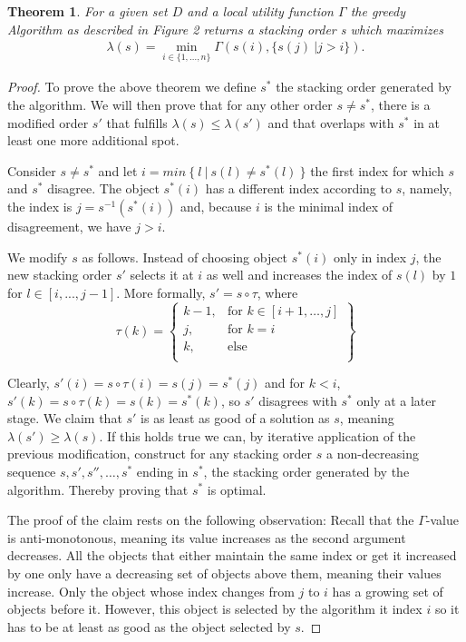 \documentclass[a4paper,11pt]{article}
\newtheorem{theorem}{Theorem}
\begin{document}
\begin{theorem}
  For a given set $D$ and a local utility function $\Gamma$ the greedy Algorithm as described in Figure 2 returns a stacking order s which maximizes\begin{align*}
    \lambda(s) = \min_{i \in \{1,\dots,n\}} \Gamma(s(i), \{s(j)\ | j > i\}).
  \end{align*}
\end{theorem}

\begin{proof}
To prove the above theorem we define $s^*$ the stacking order generated by the algorithm. We will then prove that for any other order $s\neq s^*$, there is a modified order $s'$ that fulfills $\lambda(s)\leq\lambda(s')$ and that overlaps with $s^*$ in at least one more additional spot.

Consider $s\neq s^*$ and let $i=min\ \{\ l\ |\ s(l)\neq s^*(l)\ \}$ the first index for which $s$ and $s^*$ disagree. The object $s^*(i)$ has a different index according to $s$, namely, the index is $j=s^{-1}(s^*(i))$ and, because $i$ is the minimal index of disagreement, we have $j>i$.

We modify $s$ as follows. Instead of choosing object $s^*(i)$ only in index $j$, the new stacking order $s'$ selects it at $i$ as well and increases the index of $s(l)$ by $1$ for $l\in [i,...,j-1]$. More formally, $s'=s\circ \tau$, where
\[
\tau(k) = \left\{\begin{array}{ll}
    k-1, & \text{for } k\in [i+1,\dots,j]\\
    j, & \text{for } k=i\\
    k, & \text{else}\\
    \end{array}\right\}
\]

Clearly, $s'(i) = s\circ\tau(i) = s(j) = s^*(j)$ and for $k<i$, $s'(k) = s\circ\tau(k) = s(k) = s^*(k)$, so $s'$ disagrees with $s^*$ only at a later stage. We claim that $s'$ is as least as good of a solution as $s$, meaning $\lambda(s')\geq\lambda(s)$. If this holds true we can, by iterative application of the previous modification, construct for any stacking order $s$ a non-decreasing sequence $s, s', s'', \dots, s^*$ ending in $s^*$, the stacking order generated by the algorithm. Thereby proving that $s^*$ is optimal.

The proof of the claim rests on the following observation: Recall that the $\Gamma$-value is anti-monotonous, meaning its value increases as the second argument decreases. All the objects that either maintain the same index or get it increased by one only have a decreasing set of objects above them, meaning their values increase. Only the object whose index changes from $j$ to $i$ has a growing set of objects before it. However, this object is selected by the algorithm it index $i$ so it has to be at least as good as the object selected by $s$.


\end{proof}
\end{document}
